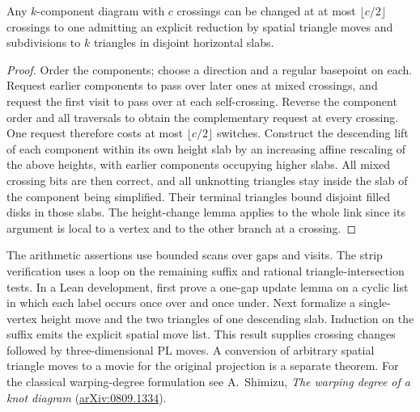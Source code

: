 \begin{corollary}
Any $k$-component diagram with $c$ crossings can be changed at at most
$\lfloor c/2\rfloor$ crossings to one admitting an explicit reduction by
spatial triangle moves and subdivisions to $k$ triangles in disjoint
horizontal slabs.
\end{corollary}
\begin{proof}
Order the components; choose a direction and a regular basepoint on each.
Request earlier components to pass over later ones at mixed crossings,
and request the first visit to pass over at each self-crossing. Reverse
the component order and all traversals to obtain the complementary
request at every crossing. One request therefore costs at most
$\lfloor c/2\rfloor$ switches. Construct the descending lift of each
component within its own height slab by an increasing affine rescaling
of the above heights, with earlier components occupying higher slabs.
All mixed crossing bits are then correct, and all unknotting triangles
stay inside the slab of the component being simplified. Their terminal
triangles bound disjoint filled disks in those slabs. The height-change
lemma applies to the whole link since its argument is local to a vertex
and to the other branch at a crossing.
\end{proof}

The arithmetic assertions use bounded scans over gaps and visits. The
strip verification uses a loop on the remaining suffix and rational
triangle-intersection tests. In a Lean development, first prove a
one-gap update lemma on a cyclic list in which each label occurs once
over and once under. Next formalize a single-vertex height move and
the two triangles of one descending slab. Induction on the suffix emits
the explicit spatial move list. This result supplies crossing changes
followed by three-dimensional PL moves. A conversion of arbitrary
spatial triangle moves to a movie for the original projection is a
separate theorem. For the classical warping-degree formulation see
A.~Shimizu, \emph{The warping degree of a knot diagram}
(\href{https://arxiv.org/abs/0809.1334}{arXiv:0809.1334}).
